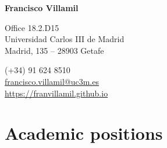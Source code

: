 \documentclass[a4paper, 12pt]{article}
\begin{document}

\begin{center}
{\bfseries\Large Francisco Villamil}
\end{center}

\vspace{0pt}

\noindent
\begin{minipage}[t]{0.47\textwidth}\small
\flushright
	Office 18.2.D15\\
	Universidad Carlos III de Madrid\\
	Madrid, 135 -- 28903 Getafe\\
\end{minipage}\hfill
\begin{minipage}[t]{0.47\textwidth}\small
	 \hspace{5pt} (+34) 91 624 8510\\
	 \hspace{5pt} \href{mailto:francisco.villamil@uc3m.es}{francisco.villamil@uc3m.es}\\
	 \hspace{5pt} \href{https://franvillamil.github.io}{https://franvillamil.github.io}\\
\end{minipage}


\vspace{-10pt}
\section*{Academic positions}
\end{document}

